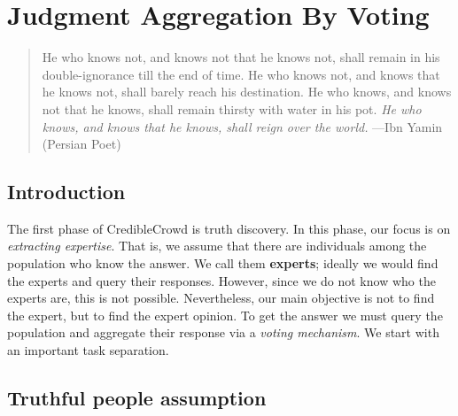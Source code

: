 \documentclass{report}
\theoremstyle{definition}
\begin{document}
\chapter{Judgment Aggregation By Voting}
\label{ch:voting}

\begin{quotation}

    \noindent He who knows not, and knows not that he knows not, shall remain in his double-ignorance till the end of time. He who knows not, and knows that he knows not, shall barely reach his destination. He who knows, and knows not that he knows, shall remain thirsty with water in his pot. \emph{He who knows, and knows that he knows, shall reign over the world.}
\hspace{1em plus 1fill}---Ibn Yamin (Persian Poet)
\end{quotation}



\section{Introduction}
The first phase of CredibleCrowd is truth discovery. In this phase, our focus is on \emph{extracting expertise}. That is, we assume that there are individuals among the population who know the answer. We call them \textbf{experts}; ideally we would find the experts and query their responses. However, since we do not know who the experts are, this is not possible. Nevertheless, our main objective is not to find the expert, but to find the expert opinion. To get the answer we must query the population and aggregate their response via a \emph{voting mechanism}. We start with an important task separation.


\section{Truthful people assumption}
\end{document}

